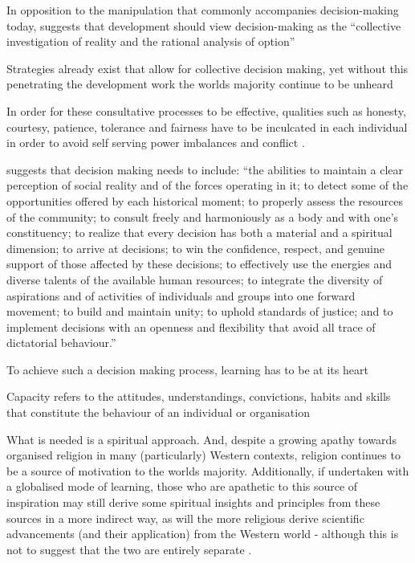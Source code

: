 In opposition to the manipulation that commonly accompanies decision-making today, \citet[][p215]{Arbab2000} suggests that development should view decision-making as the “collective investigation of reality and the rational analysis of option”

Strategies already exist that allow for collective decision making, yet without this penetrating the development work the worlds majority continue to be unheard \citep{Arbab2000}

In order for these consultative processes to be effective, qualities such as honesty, courtesy, patience, tolerance and fairness have to be inculcated in each individual in order to avoid self serving power imbalances and conflict \citep{Arbab2000}.

\citet[][p216]{Arbab2000} suggests that decision making needs to include: “the abilities to maintain a clear perception of social reality and of the forces operating in it; to detect some of the opportunities offered by each historical moment; to properly assess the resources of the community; to consult freely and harmoniously as a body and with one's constituency; to realize that every decision has both a material and a spiritual dimension; to arrive at decisions; to win the confidence, respect, and genuine support of those affected by these decisions; to effectively use the energies and diverse talents of the available human resources; to integrate the diversity of aspirations and of activities of individuals and groups into one forward movement; to build and maintain unity; to uphold standards of justice; and to implement decisions with an openness and flexibility that avoid all trace of dictatorial behaviour.”

To achieve such a decision making process, learning has to be at its heart \citep{Arbab2000}

Capacity refers to the attitudes, understandings, convictions, habits and skills that constitute the behaviour of an individual or organisation \citep{Arbab2000}

What is needed is a spiritual approach. And, despite a growing apathy towards organised religion in many (particularly) Western contexts, religion continues to be a source of motivation to the worlds majority. Additionally, if undertaken with a globalised mode of learning, those who are apathetic to this source of inspiration may still derive some spiritual insights and principles from these sources in a more indirect way, as will the more religious derive scientific advancements (and their application) from the Western world - although this is not to suggest that the two are entirely separate \citep{Arbab2000}.

